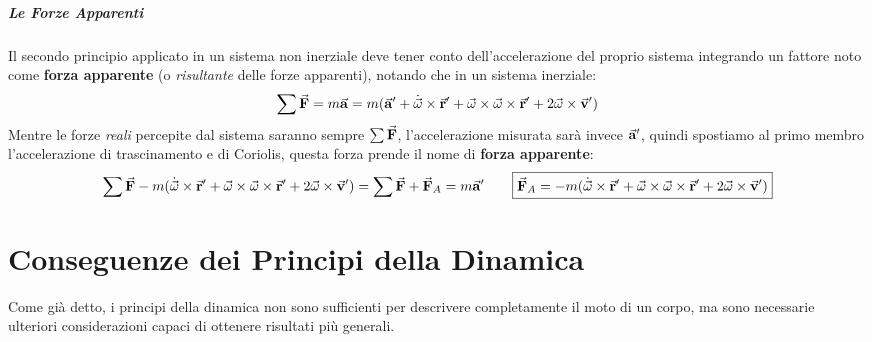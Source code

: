 \documentclass{report}
\renewcommand{\a}{\va{a}}
\renewcommand{\v}{\va{v}}
\renewcommand{\r}{\va{r}}
\newcommand{\F}{\va{F}}
\begin{document}
\paragraph{Le Forze Apparenti}
Il secondo principio applicato in un sistema non inerziale deve tener conto dell'accelerazione del proprio sistema integrando un fattore noto come \textbf{forza apparente} (o \textit{risultante} delle forze apparenti), notando che in un sistema inerziale:
\[\sum\F=m\a=m(\a'+\Dot{\va{\omega}}\times\r'+\va{\omega}\times\va{\omega}\times\r'+2\va{\omega}\times\v')\]
Mentre le forze \textit{reali} percepite dal sistema saranno sempre $\sum\F$, l'accelerazione misurata sarà invece $\a'$, quindi spostiamo al primo membro l'accelerazione di trascinamento e di Coriolis, questa forza prende il nome di \textbf{forza apparente}:
\[\sum\F-m(\Dot{\va{\omega}}\times\r'+\va{\omega}\times\va{\omega}\times\r'+2\va{\omega}\times\v')=\sum\F+\F_A=m\a'\quad\quad \boxed{\F_A=-m(\Dot{\va{\omega}}\times\r'+\va{\omega}\times\va{\omega}\times\r'+2\va{\omega}\times\v')}\]

\chapter{Conseguenze dei Principi della Dinamica}
Come già detto, i principi della dinamica non sono sufficienti per descrivere completamente il moto di un corpo, ma sono necessarie ulteriori considerazioni capaci di ottenere risultati più generali.
\end{document}
